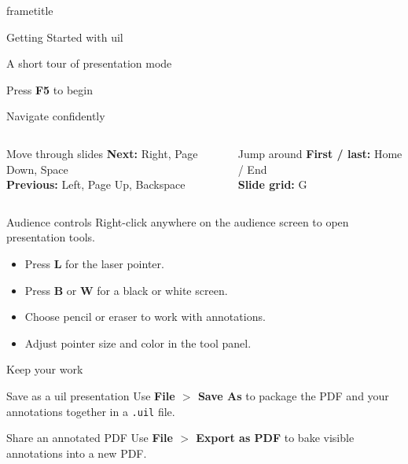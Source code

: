 \documentclass[aspectratio=169]{beamer}
\begin{document}
\begin{frame}[plain]
  \begin{beamercolorbox}[wd=\paperwidth,ht=\paperheight,dp=0pt,center]{frametitle}
    \vfill
    {\Huge Getting Started with uil\par}
    \vspace{0.7cm}
    {\Large A short tour of presentation mode\par}
    \vfill
    {\color{white}Press \textbf{F5} to begin}
    \vfill
  \end{beamercolorbox}
\end{frame}

\begin{frame}{Navigate confidently}
  \Large
  \begin{columns}[T,onlytextwidth]
      \begin{block}{Move through slides}
        \textbf{Next:} Right, Page Down, Space\\[0.35cm]
        \textbf{Previous:} Left, Page Up, Backspace
      \end{block}
      \begin{alertblock}{Jump around}
        \textbf{First / last:} Home / End\\[0.35cm]
        \textbf{Slide grid:} G
      \end{alertblock}
  \end{columns}
\end{frame}

\begin{frame}{Audience controls}
  \Large
  Right-click anywhere on the audience screen to open presentation tools.
  \vspace{0.6cm}
  \begin{itemize}
    \item Press \textbf{L} for the laser pointer.
    \item Press \textbf{B} or \textbf{W} for a black or white screen.
    \item Choose pencil or eraser to work with annotations.
    \item Adjust pointer size and color in the tool panel.
  \end{itemize}
\end{frame}

\begin{frame}{Keep your work}
  \Large
  \begin{block}{Save as a uil presentation}
    Use \textbf{File $>$ Save As} to package the PDF and your annotations together in a \texttt{.uil} file.
  \end{block}
  \vspace{0.4cm}
  \begin{block}{Share an annotated PDF}
    Use \textbf{File $>$ Export as PDF} to bake visible annotations into a new PDF.
  \end{block}
\end{frame}
\end{document}

